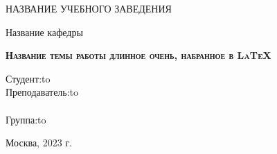\documentclass[a4paper,14pt]{extarticle}
\begin{document}
	\begin{titlepage}
	\newpage
	
	\begin{center}
		НАЗВАНИЕ УЧЕБНОГО ЗАВЕДЕНИЯ \\
	\end{center}
	
	\vspace{8em}
	
	\begin{center}
		\Large Название кафедры \\ 
	\end{center}
	
	\vspace{2em}
	
	\begin{center}
		\textsc{\textbf{Название темы работы \linebreak длинное очень, набранное в \LaTeX{}}}
	\end{center}
	
	\vspace{6em}
	
	
	
	\newbox{\lbox}
	\newlength{\maxl}
	\setlength{\maxl}{\wd\lbox}
	\hfill\parbox{11cm}{
		\hspace*{5cm}\hspace*{-5cm}Студент:\hfill\hbox to\\
		\hspace*{5cm}\hspace*{-5cm}Преподаватель:\hfill\hbox to\\
		\\
		\hspace*{5cm}\hspace*{-5cm}Группа:\hfill\hbox to\\
	}
	
	
	\vspace{\fill}
	
	\begin{center}
		Москва, 2023 г.
	\end{center}
	\end{titlepage}
\end{document}
